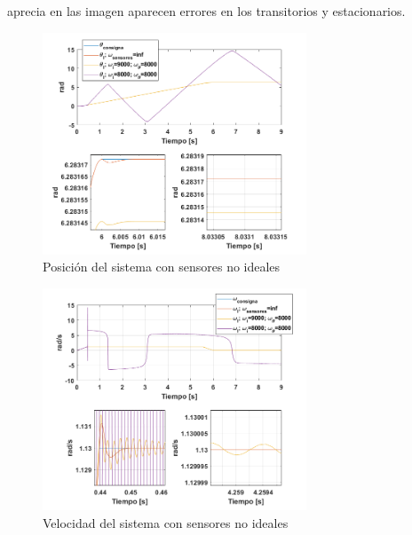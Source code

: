 \documentclass[10pt]{article}
\begin{document}
\begin{itemize}
 aprecia en las imagen aparecen errores en los transitorios y estacionarios.
 \begin{figure}[h!]
	\centering
	\includegraphics[width=0.7\textwidth]{theta_consignas.png}
	\caption{\label{fig:theta_consignas}Posición del sistema con sensores no ideales}
	\end{figure}
 \begin{figure}[h!]
	\centering
	\includegraphics[width=0.7\textwidth]{omega_sensores.png}
	\caption{\label{fig:omega_sensores}Velocidad del sistema con sensores no ideales}
	\end{figure}

\end{itemize}

\newpage
\end{document}
